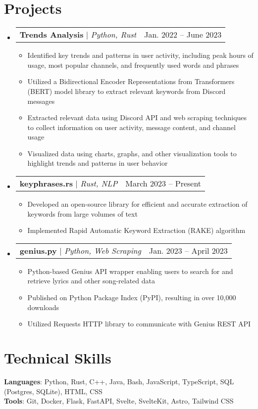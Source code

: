 \documentclass[letterpaper,11pt]{article}
\makeatletter
\newcommand{\resumeItem}[1]{
  \item\small{
    {#1 \vspace{-2pt}}
  }
}
\newcommand{\resumeProjectHeading}[2]{
    \item
    \begin{tabular*}{0.97\textwidth}{l@{\extracolsep{\fill}}r}
      \small#1 & #2 \\
    \end{tabular*}\vspace{-7pt}
}
\newcommand{\resumeSubHeadingListStart}{\begin{itemize}[leftmargin=0.15in, label={}]}
\newcommand{\resumeSubHeadingListEnd}{\end{itemize}}
\newcommand{\resumeItemListStart}{\begin{itemize}}
\newcommand{\resumeItemListEnd}{\end{itemize}\vspace{-5pt}}
\makeatother
\begin{document}
\section{Projects}
    \resumeSubHeadingListStart
        \resumeProjectHeading
              {\textbf{Trends Analysis} $|$ \emph{Python, Rust}}{Jan. 2022 -- June 2023}
              \resumeItemListStart
                \resumeItem{Identified key trends and patterns in user activity, including peak hours of usage, most popular channels, and frequently used words and phrases}
                \resumeItem{Utilized a Bidirectional Encoder Representations from Transformers (BERT) model library to extract relevant keywords from Discord messages}
                \resumeItem{Extracted relevant data using Discord API and web scraping techniques to collect information on user activity, message content, and channel usage}
                \resumeItem{Visualized data using charts, graphs, and other visualization tools to highlight trends and patterns in user behavior}
              \resumeItemListEnd
      \resumeProjectHeading
          {\textbf{keyphrases.rs} $|$ \emph{Rust, NLP}}{March 2023 -- Present}
          \resumeItemListStart
            \resumeItem{Developed an open-source library for efficient and accurate extraction of keywords from large volumes of text}
            \resumeItem{Implemented Rapid Automatic Keyword Extraction (RAKE) algorithm}
          \resumeItemListEnd
      \resumeProjectHeading
          {\textbf{genius.py} $|$ \emph{Python, Web Scraping}}{Jan. 2023 -- April 2023}
          \resumeItemListStart
            \resumeItem{Python-based Genius API wrapper enabling users to search for and retrieve lyrics and other song-related data}
            \resumeItem{Published on Python Package Index (PyPI), resulting in over 10,000 downloads}
            \resumeItem{Utilized Requests HTTP library to communicate with Genius REST API}
          \resumeItemListEnd
    \resumeSubHeadingListEnd

\section{Technical Skills}
 \begin{itemize}[leftmargin=0.15in, label={}]
    \small{\item{
     \textbf{Languages}{: Python, Rust, C++, Java, Bash, JavaScript, TypeScript, SQL (Postgres, SQLite), HTML, CSS } \\
     \textbf{Tools}{: Git, Docker, Flask, FastAPI, Svelte, SvelteKit, Astro, Tailwind CSS} \\
    }}
 \end{itemize}
\end{document}
